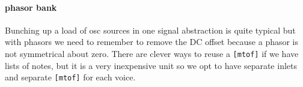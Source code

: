 \paragraph{phasor bank}
Bunching up a load of osc sources in one signal abstraction is quite typical
but with phasors we need to remember to remove the DC offset
because a phasor is not symmetrical about zero. There are clever
ways to reuse a \verb+[mtof]+ if we have lists of notes, but it
is a very inexpensive unit so we opt to have separate inlets
and separate \verb+[mtof]+ for each voice. 